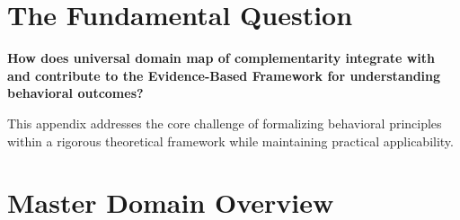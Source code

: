 \section{The Fundamental Question}
\label{sec:cat-fundamental}

\begin{tcolorbox}[
    colback=red!5!white,
    colframe=red!75!black,
    title={\textbf{Fundamental Question}}
]
\textbf{How does universal domain map of complementarity integrate with and contribute to the
Evidence-Based Framework for understanding behavioral outcomes?}

This appendix addresses the core challenge of formalizing behavioral principles
within a rigorous theoretical framework while maintaining practical applicability.
\end{tcolorbox}


\section{Master Domain Overview}
\label{sec:overview}

